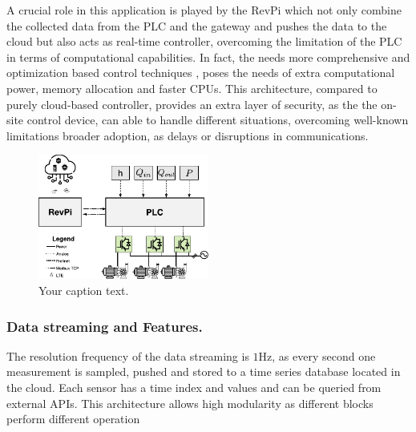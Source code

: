 A crucial role in this application is played by the RevPi which not only combine the collected data from the 
PLC and the gateway and pushes the data to the cloud but also acts as real-time controller, overcoming the limitation 
of the PLC in terms of computational capabilities. In fact, the needs more comprehensive and optimization based control techniques 
, poses the needs of extra computational power, memory allocation and faster CPUs.
This architecture, compared to purely cloud-based controller, provides an extra layer of security, as the the on-site control device, can able to handle different 
situations, overcoming well-known limitations broader adoption, as delays or disruptions in communications.


\begin{figure}[h]
    \centering
    \hspace{2cm}
    \includegraphics[width=0.5\textwidth]{img/schematic.pdf}
    \caption{Your caption text.}
    \label{fig:your_label}
\end{figure}


\subsubsection{Data streaming and Features.}
The resolution frequency of the data streaming is $1\si{\hertz}$, as every second one measurement is sampled, pushed and stored to a time series database 
located in the cloud. Each sensor has a time index and values and can be queried from external APIs. 
This architecture allows high modularity as different blocks perform different operation



